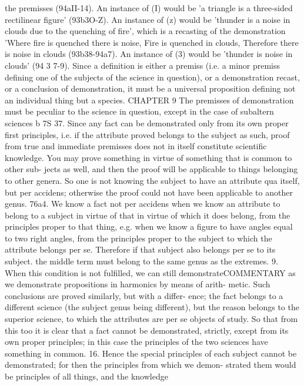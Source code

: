 {{{{{{{{{the premisses (94aII-14). An instance of (I) would be 'a triangle
is a three-sided rectilinear figure' (93b3O-Z). An instance of (z)
would be 'thunder is a noise in clouds due to the quenching of
fire', which is a recasting of the demonstration 'Where fire is
quenched there is noise, Fire is quenched in clouds, Therefore
there is noise in clouds (93b38-94a7). An instance of (3) would be
'thunder is noise in clouds' (94 3 7-9).
Since a definition is either a premiss (i.e. a minor premiss
defining one of the subjects of the science in question), or a
demonstration recast, or a conclusion of demonstration, it must
be a universal proposition defining not an individual thing but
a species.
CHAPTER 9
The premisses of demonstration must be peculiar to the science in
question, except in the case of subaltern sciences
b
7S 37. Since any fact can be demonstrated only from its own
proper first principles, i.e. if the attribute proved belongs to the
subject as such, proof from true and immediate premisses does
not in itself constitute scientific knowledge. You may prove
something in virtue of something that is common to other sub-
jects as well, and then the proof will be applicable to things
belonging to other genera. So one is not knowing the subject to
have an attribute qua itself, but per accidens; otherwise the proof
could not have been applicable to another genus.
76a4. We know a fact not per accidens when we know an
attribute to belong to a subject in virtue of that in virtue of which
it does belong, from the principles proper to that thing, e.g. when
we know a figure to have angles equal to two right angles, from
the principles proper to the subject to which the attribute belongs
per se. Therefore if that subject also belongs per se to its subject.
the middle term must belong to the same genus as the extremes.
9. When this condition is not fulfilled, we can still demonstrateCOMMENTARY
as we demonstrate propositions in harmonics by means of arith-
metic. Such conclusions are proved similarly, but with a differ-
ence; the fact belongs to a different science (the subject genus
being different), but the reason belongs to the superior science,
to which the attributes are per se objects of study. So that from
this too it is clear that a fact cannot be demonstrated, strictly,
except from its own proper principles; in this case the principles
of the two sciences have something in common.
16. Hence the special principles of each subject cannot be
demonstrated; for then the principles from which we demon-
strated them would be principles of all things, and the knowledge
}}}}}}}}}
